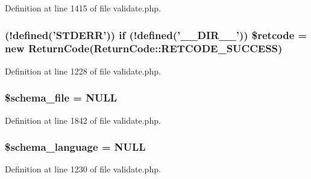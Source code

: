 Definition at line 1415 of file validate.\+php.

\hypertarget{validate_8php_a87d4dc54461ff155cd633f2ece7cd9e4}{
\subsubsection[{\$retcode}]{ (!defined('S\+T\+D\+E\+R\+R')) {\bf if} (!defined('\+\_\+\+\_\+\+D\+I\+R\+\_\+\+\_\+')) \$retcode = new {\bf Return\+Code}({\bf Return\+Code\+::\+R\+E\+T\+C\+O\+D\+E\+\_\+\+S\+U\+C\+C\+E\+S\+S})}}\label{validate_8php_a87d4dc54461ff155cd633f2ece7cd9e4}


Definition at line 1228 of file validate.\+php.

\hypertarget{validate_8php_a72d6f00099d1020a9938b75d78d31db3}{
\subsubsection[{\$schema\+\_\+file}]{\setlength{\rightskip}{0pt plus 5cm}\$schema\+\_\+file = N\+U\+L\+L}}\label{validate_8php_a72d6f00099d1020a9938b75d78d31db3}


Definition at line 1842 of file validate.\+php.

\hypertarget{validate_8php_a8da6d5929566e961bc11f25104519c1a}{
\subsubsection[{\$schema\+\_\+language}]{\setlength{\rightskip}{0pt plus 5cm}\$schema\+\_\+language = N\+U\+L\+L}}\label{validate_8php_a8da6d5929566e961bc11f25104519c1a}


Definition at line 1230 of file validate.\+php.

